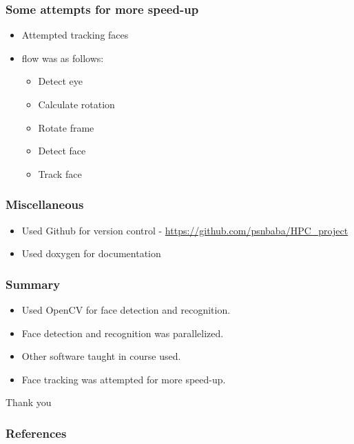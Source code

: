 \documentclass[aspectratio=149]{beamer}
\begin{document}

\begin{frame}
\frametitle{Some attempts for more speed-up}
\begin{itemize}
	\item Attempted tracking faces
	\item flow was as follows:
	\begin{itemize}
		\item Detect eye
		\item Calculate rotation
		\item Rotate frame
		\item Detect face
		\item Track face
	\end{itemize}	
\end{itemize}
\end{frame}


\begin{frame}
\frametitle{Miscellaneous}
\begin{itemize}
	\item Used Github for version control - \url{https://github.com/psnbaba/HPC_project}
	\item Used doxygen for documentation	
\end{itemize}
\end{frame}


\begin{frame}
\frametitle{Summary}
\begin{itemize}
	\item Used OpenCV for face detection and recognition.
	\item Face detection and recognition was parallelized.
	\item Other software taught in course used.
	\item Face tracking was attempted for more speed-up.
\end{itemize}
\end{frame}


\begin{frame}
    \centering
    Thank you
\end{frame}

\begin{frame}[t,allowframebreaks]
  \frametitle{References}
  \printbibliography{}
\end{frame}


\end{document}
